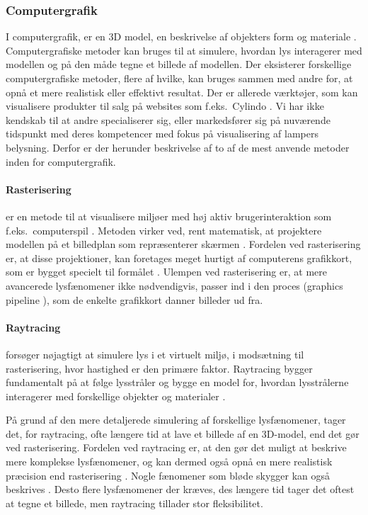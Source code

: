 \subsubsection{Computergrafik}
\label{sec:computergrafik}
I computergrafik, er en 3D model, en beskrivelse af objekters form og materiale \cite{computergrafik_introduktion}. Computergrafiske metoder kan bruges til at simulere, hvordan lys interagerer med modellen og på den måde tegne et billede af modellen. Der eksisterer forskellige computergrafiske metoder, flere af hvilke, kan bruges sammen med andre for, at opnå et mere realistisk eller effektivt resultat. Der er allerede værktøjer, som kan visualisere produkter til salg på websites som f.eks.\ Cylindo \cite{Cylindo}. Vi har ikke kendskab til at andre specialiserer sig, eller markedsfører sig på nuværende tidspunkt med deres kompetencer med fokus på visualisering af lampers belysning. Derfor er der herunder beskrivelse af to af de mest anvende metoder inden for computergrafik.

\paragraph{Rasterisering}
er en metode til at visualisere miljøer med høj aktiv brugerinteraktion som f.eks.\ computerspil \cite{rastarization}. Metoden virker ved, rent matematisk, at projektere modellen på et billedplan som repræsenterer skærmen \cite{rastarization}. Fordelen ved rasterisering er, at disse projektioner, kan foretages meget hurtigt af computerens grafikkort, som er bygget specielt til formålet \cite{rastarization}. Ulempen ved rasterisering er, at mere avancerede lysfænomener ikke nødvendigvis, passer ind i den proces (graphics pipeline \cite{rastarization}), som de enkelte grafikkort danner billeder ud fra. 

\paragraph{Raytracing} forsøger nøjagtigt at simulere lys i et virtuelt miljø, i modsætning til rasterisering, hvor hastighed er den primære faktor. Raytracing bygger fundamentalt på at følge lysstråler og bygge en model for, hvordan lysstrålerne interagerer med forskellige objekter og materialer \cite{raytracing_for_begyndere}. 

På grund af den mere detaljerede simulering af forskellige lysfænomener, tager det, for raytracing, ofte længere tid at lave et billede af en 3D-model, end det gør ved rasterisering. Fordelen ved raytracing er, at den gør det muligt at beskrive mere komplekse lysfænomener, og kan dermed også opnå en mere realistisk præcision end rasterisering \cite{raytracingvsrastarizatioin}. Nogle fænomener som bløde skygger kan også beskrives \cite{softshadow}. Desto flere lysfænomener der kræves, des længere tid tager det oftest at tegne et billede, men raytracing tillader stor fleksibilitet.